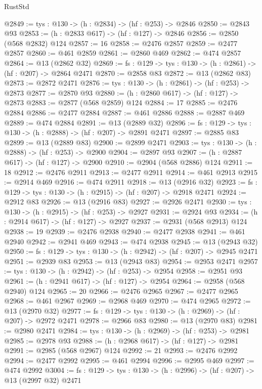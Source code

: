 \begin{lexlean}{RustStd}
\begin{coremodule}
@2849 := {tys : @130} -> (h : @2834) -> (hf : @253) -> @2846
@2850 := @2843 @93
@2853 := (h : @2833 @617) -> (hf : @127) -> @2846
@2856 := @2850 (@568 @2832) @124
@2857 := 16
@2858 := @2476 @2857
@2859 := @2477 @2857
@2860 := @461 @2859
@2861 := @2860 @469
@2862 := @474 @2857
@2864 := @13 (@2862 @32)
@2869 := {fs : @129} -> {tys : @130} -> (h : @2861) -> (hf : @207) -> @2864 @2471
@2870 := @2858 @83
@2872 := @13 (@2862 @83)
@2873 := @2872 @2471
@2876 := {tys : @130} -> (h : @2861) -> (hf : @253) -> @2873
@2877 := @2870 @93
@2880 := (h : @2860 @617) -> (hf : @127) -> @2873
@2883 := @2877 (@568 @2859) @124
@2884 := 17
@2885 := @2476 @2884
@2886 := @2477 @2884
@2887 := @461 @2886
@2888 := @2887 @469
@2889 := @474 @2884
@2891 := @13 (@2889 @32)
@2896 := {fs : @129} -> {tys : @130} -> (h : @2888) -> (hf : @207) -> @2891 @2471
@2897 := @2885 @83
@2899 := @13 (@2889 @83)
@2900 := @2899 @2471
@2903 := {tys : @130} -> (h : @2888) -> (hf : @253) -> @2900
@2904 := @2897 @93
@2907 := (h : @2887 @617) -> (hf : @127) -> @2900
@2910 := @2904 (@568 @2886) @124
@2911 := 18
@2912 := @2476 @2911
@2913 := @2477 @2911
@2914 := @461 @2913
@2915 := @2914 @469
@2916 := @474 @2911
@2918 := @13 (@2916 @32)
@2923 := {fs : @129} -> {tys : @130} -> (h : @2915) -> (hf : @207) -> @2918 @2471
@2924 := @2912 @83
@2926 := @13 (@2916 @83)
@2927 := @2926 @2471
@2930 := {tys : @130} -> (h : @2915) -> (hf : @253) -> @2927
@2931 := @2924 @93
@2934 := (h : @2914 @617) -> (hf : @127) -> @2927
@2937 := @2931 (@568 @2913) @124
@2938 := 19
@2939 := @2476 @2938
@2940 := @2477 @2938
@2941 := @461 @2940
@2942 := @2941 @469
@2943 := @474 @2938
@2945 := @13 (@2943 @32)
@2950 := {fs : @129} -> {tys : @130} -> (h : @2942) -> (hf : @207) -> @2945 @2471
@2951 := @2939 @83
@2953 := @13 (@2943 @83)
@2954 := @2953 @2471
@2957 := {tys : @130} -> (h : @2942) -> (hf : @253) -> @2954
@2958 := @2951 @93
@2961 := (h : @2941 @617) -> (hf : @127) -> @2954
@2964 := @2958 (@568 @2940) @124
@2965 := 20
@2966 := @2476 @2965
@2967 := @2477 @2965
@2968 := @461 @2967
@2969 := @2968 @469
@2970 := @474 @2965
@2972 := @13 (@2970 @32)
@2977 := {fs : @129} -> {tys : @130} -> (h : @2969) -> (hf : @207) -> @2972 @2471
@2978 := @2966 @83
@2980 := @13 (@2970 @83)
@2981 := @2980 @2471
@2984 := {tys : @130} -> (h : @2969) -> (hf : @253) -> @2981
@2985 := @2978 @93
@2988 := (h : @2968 @617) -> (hf : @127) -> @2981
@2991 := @2985 (@568 @2967) @124
@2992 := 21
@2993 := @2476 @2992
@2994 := @2477 @2992
@2995 := @461 @2994
@2996 := @2995 @469
@2997 := @474 @2992
@3004 := {fs : @129} -> {tys : @130} -> (h : @2996) -> (hf : @207) -> @13 (@2997 @32) @2471

\end{coremodule}
\end{lexlean}

